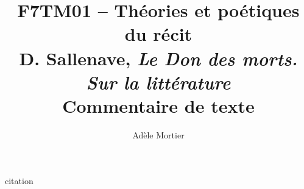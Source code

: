 \documentclass[a4paper,10pt]{article}
\title{F7TM01 -- Théories et poétiques du récit\\
	 D. Sallenave, \textit{Le Don des morts. Sur la littérature}\\ \vspace{0.3cm}
	 \small Commentaire de texte}
\author{Adèle Mortier}
\begin{document}
\maketitle
\nocite{*}


\begin{center}
	\footnotesize
	\begin{minipage}{0.7\textwidth}
		citation
	\end{minipage}
\end{center}
\medskip



\end{document}
